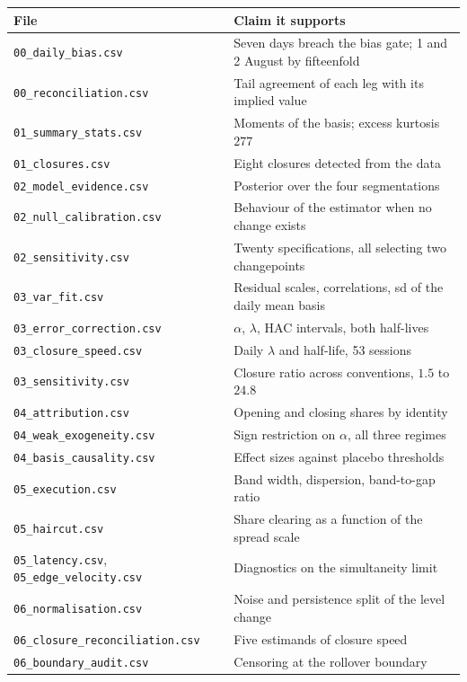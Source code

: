 \documentclass[11pt,a4paper]{article}
\newcommand{\code}[1]{\texttt{\small #1}}
\begin{document}
\small
\begin{tabularx}{\linewidth}{@{}lX@{}}
\toprule
\textbf{File} & \textbf{Claim it supports} \\
\midrule
\code{00\_daily\_bias.csv} & Seven days breach the bias gate; 1 and 2 August by fifteenfold \\
\code{00\_reconciliation.csv} & Tail agreement of each leg with its implied value \\
\code{01\_summary\_stats.csv} & Moments of the basis; excess kurtosis $277$ \\
\code{01\_closures.csv} & Eight closures detected from the data \\
\code{02\_model\_evidence.csv} & Posterior over the four segmentations \\
\code{02\_null\_calibration.csv} & Behaviour of the estimator when no change exists \\
\code{02\_sensitivity.csv} & Twenty specifications, all selecting two changepoints \\
\code{03\_var\_fit.csv} & Residual scales, correlations, sd of the daily mean basis \\
\code{03\_error\_correction.csv} & $\alpha$, $\lambda$, HAC intervals, both half-lives \\
\code{03\_closure\_speed.csv} & Daily $\lambda$ and half-life, 53 sessions \\
\code{03\_sensitivity.csv} & Closure ratio across conventions, $1.5$ to $24.8$ \\
\code{04\_attribution.csv} & Opening and closing shares by identity \\
\code{04\_weak\_exogeneity.csv} & Sign restriction on $\alpha$, all three regimes \\
\code{04\_basis\_causality.csv} & Effect sizes against placebo thresholds \\
\code{05\_execution.csv} & Band width, dispersion, band-to-gap ratio \\
\code{05\_haircut.csv} & Share clearing as a function of the spread scale \\
\code{05\_latency.csv}, \code{05\_edge\_velocity.csv} & Diagnostics on the simultaneity limit \\
\code{06\_normalisation.csv} & Noise and persistence split of the level change \\
\code{06\_closure\_reconciliation.csv} & Five estimands of closure speed \\
\code{06\_boundary\_audit.csv} & Censoring at the rollover boundary \\

\end{tabularx}
\end{document}
